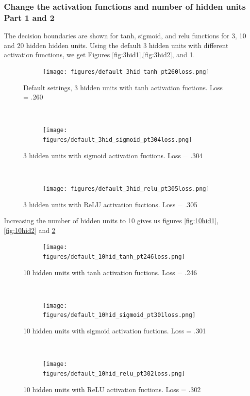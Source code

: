 \documentclass[]{article}
\begin{document}
\subsubsection{Change the activation functions and number of hidden units Part 1 and 2}
The decision boundaries are shown for tanh, sigmoid, and relu functions for 3, 10 and 20 hidden hidden units.
Using the default 3 hidden units with different activation functions, we get Figures \ref{fig:3hid1},\ref{fig:3hid2}, and \ref{fig:3hid3}.
\begin{figure}[ht]
    \centering
    \begin{subfigure}
        \centering
        \texttt{[image: figures/default\_3hid\_tanh\_pt260loss.png]}
    \end{subfigure}%
    \caption{Default settings, 3 hidden units with tanh activation fuctions. Loss = .260}
\label{fig:3hid1}
    ~ 
    \begin{subfigure}
        \centering
        \texttt{[image: figures/default\_3hid\_sigmoid\_pt304loss.png]}
    \end{subfigure}
    \caption{3 hidden units with sigmoid activation fuctions. Loss = .304}
\label{fig:3hid2}
    ~ 
    \begin{subfigure}
        \centering
        \texttt{[image: figures/default\_3hid\_relu\_pt305loss.png]}
    \end{subfigure}
    \caption{3 hidden units with ReLU activation fuctions. Loss = .305}
\label{fig:3hid3}
\end{figure}

Increasing the number of hidden units to 10 gives us figures \ref{fig:10hid1}, \ref{fig:10hid2} and  \ref{fig:10hid3}

\begin{figure}[ht]
    \centering
    \begin{subfigure}
        \centering
        \texttt{[image: figures/default\_10hid\_tanh\_pt246loss.png]}
    \end{subfigure}%
    \caption{10 hidden units with tanh activation fuctions. Loss = .246}
 \label{fig:10hid1}
    ~ 
    \begin{subfigure}
        \centering
        \texttt{[image: figures/default\_10hid\_sigmoid\_pt301loss.png]}
    \end{subfigure}
    \caption{10 hidden units with sigmoid activation fuctions. Loss = .301}
 \label{fig:10hid2}
    ~ 
    \begin{subfigure}
        \centering
        \texttt{[image: figures/default\_10hid\_relu\_pt302loss.png]}
    \end{subfigure}
    \caption{10 hidden units with ReLU activation fuctions. Loss = .302}
 \label{fig:10hid3}
\end{figure}
\end{document}
